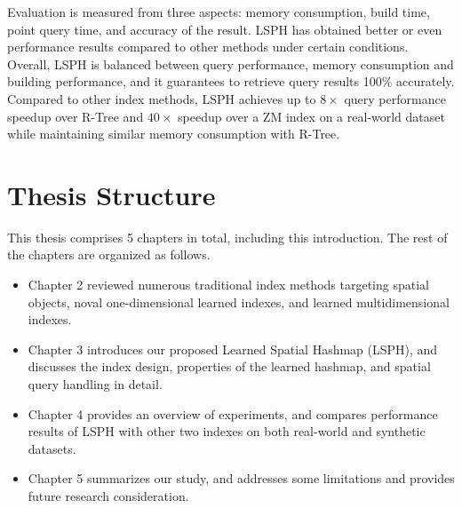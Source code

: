 Evaluation is measured from three aspects: memory consumption, build time, point query time, and accuracy of the result. LSPH has obtained better or even performance results compared to other methods under certain conditions. Overall, LSPH is balanced between query performance, memory consumption and building performance, and it guarantees to retrieve query results 100\% accurately. Compared to other index methods, LSPH achieves up to $8\times$ query performance speedup over R-Tree and $40\times$ speedup over a ZM index on a real-world dataset while maintaining similar memory consumption with R-Tree.  




\section{Thesis Structure}
This thesis comprises 5 chapters in total, including this introduction. The rest of the chapters are organized as follows. 
\begin{itemize}
    \item Chapter 2 reviewed numerous traditional index methods targeting spatial objects, noval one-dimensional learned indexes, and learned multidimensional indexes. 
    \item Chapter 3 introduces our proposed Learned Spatial Hashmap (LSPH), and discusses the index design, properties of the learned hashmap, and spatial query handling in detail. 
    \item Chapter 4 provides an overview of experiments, and compares performance results of LSPH with other two indexes on both real-world and synthetic datasets. 
    \item Chapter 5 summarizes our study, and addresses some limitations and provides future research consideration. 
\end{itemize}
